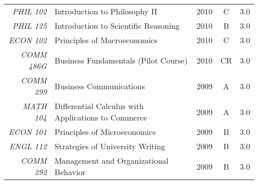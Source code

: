 \documentclass[11pt, a4paper]{awesome-cv}
\begin{document}
\begin{cvletter}
\begin{tabularx}{\linewidth}{ r|Xccc }
\textit{PHIL 102} & \large Introduction to Philosophy II  & 2010 & C & 3.0 \\
\textit{PHIL 125} & \large Introduction to Scientific Reasoning & 2010 & B & 3.0 \\
\textit{ECON 102} & \large Principles of Macroeconomics  &  2010 & C & 3.0 \\
\textit{COMM 486G} & \large Business Fundamentals (Pilot Course) &  2010 & CR & 3.0 \\
\textit{COMM 299} & \large Business Communications &  2009 & A & 3.0 \\
\textit{MATH 104} & \large Differential Calculus with Applications to Commerce & 2009 & A & 3.0 \\
\textit{ECON 101} & \large Principles of Microeconomics & 2009 & B & 3.0 \\
\textit{ENGL 112} & \large Strategies of University Writing & 2009 & B & 3.0 \\
\textit{COMM 292} & \large Management and Organizational Behavior  &  2009 & B & 3.0 \\


\end{tabularx}

\end{cvletter}


\end{document}
